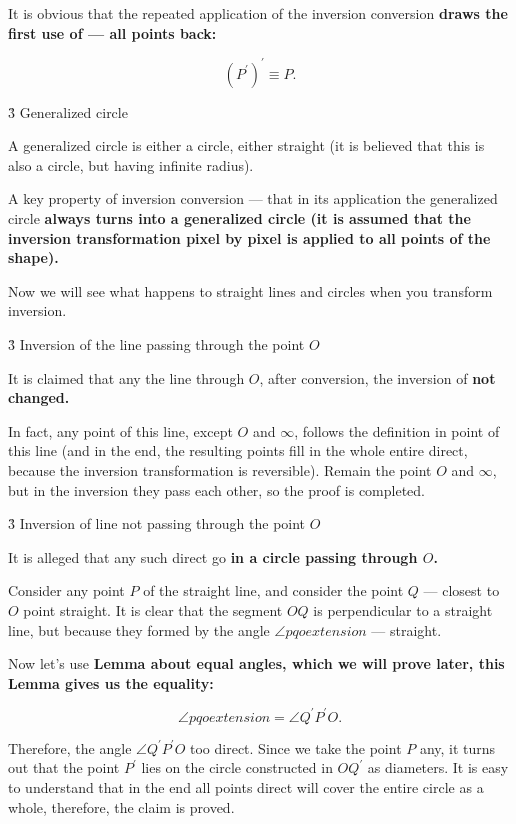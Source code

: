 It is obvious that the repeated application of the inversion conversion \bf{draws} the first use of --- all points back:

$$ \left( P^\prime \right) ^\prime \equiv P. $$


\h3{ Generalized circle }

A generalized circle is either a circle, either straight (it is believed that this is also a circle, but having infinite radius).

A key property of inversion conversion --- that in its application the generalized circle \bf{always turns into a generalized circle} (it is assumed that the inversion transformation pixel by pixel is applied to all points of the shape).

Now we will see what happens to straight lines and circles when you transform inversion.


\h3{ Inversion of the line passing through the point $O$ }

It is claimed that any the line through $O$, after conversion, the inversion of \bf{not changed}.

In fact, any point of this line, except $O$ and $\infty$, follows the definition in point of this line (and in the end, the resulting points fill in the whole entire direct, because the inversion transformation is reversible). Remain the point $O$ and $\infty$, but in the inversion they pass each other, so the proof is completed.


\h3{ Inversion of line not passing through the point $O$ }

It is alleged that any such direct go \bf{in a circle} passing through $O$.


Consider any point $P$ of the straight line, and consider the point $Q$ --- closest to $O$ point straight. It is clear that the segment $OQ$ is perpendicular to a straight line, but because they formed by the angle $\angle pqo extension$ --- straight.

Now let's use \bf{Lemma about equal angles}, which we will prove later, this Lemma gives us the equality:

$$ \angle pqo extension = \angle Q^\prime P^\prime O. $$

Therefore, the angle $\angle Q^\prime P^\prime O$ too direct. Since we take the point $P$ any, it turns out that the point $P^\prime$ lies on the circle constructed in $O Q^\prime$ as diameters. It is easy to understand that in the end all points direct will cover the entire circle as a whole, therefore, the claim is proved.


